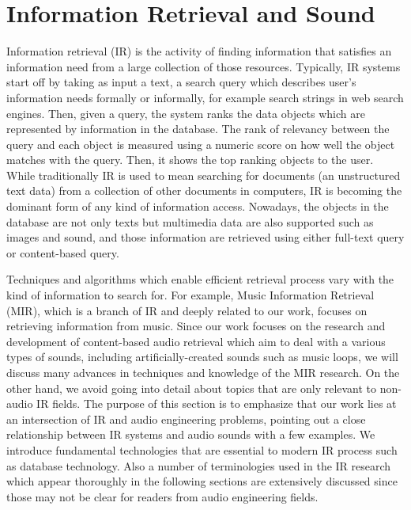 \section{Information Retrieval and Sound}
Information retrieval (IR) is the activity of finding information that satisfies an information need from a large collection of those resources. Typically, IR systems start off by taking as input a text, a search query which describes user's information needs formally or informally, for example search strings in web search engines. Then, given a query, the system ranks the data objects which are represented by information in the database. The rank of relevancy between the query and each object is measured using a numeric score on how well the object matches with the query. Then, it shows the top ranking objects to the user. While traditionally IR is used to mean searching for documents (an unstructured text data) from a collection of other documents in computers, IR is becoming the dominant form of any kind of information access. Nowadays, the objects in the database are not only texts but multimedia data are also supported such as images and sound, and those information are retrieved using either full-text query or content-based query.

Techniques and algorithms which enable efficient retrieval process vary with the kind of information to search for. For example, Music Information Retrieval (MIR), which is a branch of IR and deeply related to our work, focuses on retrieving information from music. Since our work focuses on the research and development of content-based audio retrieval which aim to deal with a various types of sounds, including artificially-created sounds such as music loops, we will discuss many advances in techniques and knowledge of the MIR research. On the other hand, we avoid going into detail about topics that are only relevant to non-audio IR fields. The purpose of this section is to emphasize that our work lies at an intersection of IR and audio engineering problems, pointing out a close relationship between IR systems and audio sounds with a few examples. We introduce fundamental technologies that are essential to modern IR process such as database technology. Also a number of terminologies used in the IR research which appear thoroughly in the following sections are extensively discussed since those may not be clear for readers from audio engineering fields.

